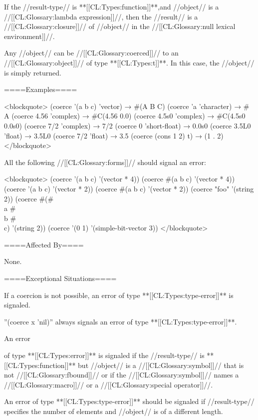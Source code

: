 If the //result-type// is **[[CL:Types:function]]**,and //object// is a //[[CL:Glossary:lambda expression]]//, then the //result// is a //[[CL:Glossary:closure]]// of //object// in the //[[CL:Glossary:null lexical environment]]//.

\itemitem{**[[CL:Types:t]]**}

Any //object// can be //[[CL:Glossary:coerced]]// to an //[[CL:Glossary:object]]// of type **[[CL:Types:t]]**. In this case, the //object// is simply returned.

\endlist

====Examples====

<blockquote> (coerce '(a b c) 'vector) → #(A B C) (coerce 'a 'character) → #\\A (coerce 4.56 'complex) → #C(4.56 0.0) (coerce 4.5s0 'complex) → #C(4.5s0 0.0s0) (coerce 7/2 'complex) → 7/2 (coerce 0 'short-float) → 0.0s0 (coerce 3.5L0 'float) → 3.5L0 (coerce 7/2 'float) → 3.5 (coerce (cons 1 2) t) → (1 . 2) </blockquote>

All the following //[[CL:Glossary:forms]]// should signal an error:

<blockquote> (coerce '(a b c) '(vector * 4)) (coerce #(a b c) '(vector * 4)) (coerce '(a b c) '(vector * 2)) (coerce #(a b c) '(vector * 2)) (coerce "foo" '(string 2)) (coerce #(#\\a #\\b #\\c) '(string 2)) (coerce '(0 1) '(simple-bit-vector 3)) </blockquote>

====Affected By====

None.

====Exceptional Situations====

If a coercion is not possible, an error of type **[[CL:Types:type-error]]** is signaled.

''(coerce x 'nil)'' always signals an error of type **[[CL:Types:type-error]]**.

An error

of type **[[CL:Types:error]]** is signaled if the //result-type// is **[[CL:Types:function]]** but //object// is a //[[CL:Glossary:symbol]]// that is not //[[CL:Glossary:fbound]]// or if the //[[CL:Glossary:symbol]]// names a //[[CL:Glossary:macro]]// or a //[[CL:Glossary:special operator]]//.

An error of type **[[CL:Types:type-error]]** should be signaled if //result-type// specifies the number of elements and //object// is of a different length.


